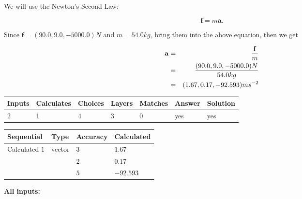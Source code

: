 \documentclass[12pt]{article}
\begin{document}
 

We will use the Newton's Second Law:
 
\[
\mathbf{f}=m\mathbf{a}.
\]
 
Since $\mathbf{f}= %
(90.0 , 9.0 , -5000.0) N$
and $m= %
54.0kg$, bring them into the above equation, then we get
 
\begin{eqnarray*}
\mathbf{a}&=&\frac{\mathbf{f}}m  \\
&=&\frac{ %
(90.0 , 9.0 , -5000.0) N}{ %
54.0kg}  \\
&=& %
(1.67 , 0.17 , -92.593) ms^{-2}
\end{eqnarray*}
 
 
 
\noindent{}
 
 

 
 
\vspace{0.3in}
   
   
   
   
\noindent\begin{tabular}{|l|l|l|l|l|l|l|}
 \hline
Inputs & Calculates & Choices & Layers & Matches & Answer & Solution \\ \hline
           2  & 
           1  & 
           4
  & 
           3  & 
           0  & 
  yes & 
  yes 
  \\ \hline
 \end{tabular}
   
   
   
   
\noindent{}
   
   
  
  
\noindent\begin{tabular}{|l|l|l|l|}
\hline
 Sequential & Type & Accuracy & Calculated \\ 
\hline
 
 
  Calculated $            1 $ & vector &  
  $            3  $ 
 &  $ 1.67 $ 
 \\    
  & & 
  $            2  $ 
 &  $ 0.17 $ 
 \\    
  & & 
  $            5  $ 
 &  $ -92.593 $ 
 \\  \hline  
 \end{tabular}
   
   
   
   
\noindent\vspace{0.1in}\hspace{-0.08in} {\textbf{\Large{All inputs: }}}
   
\end{document}
